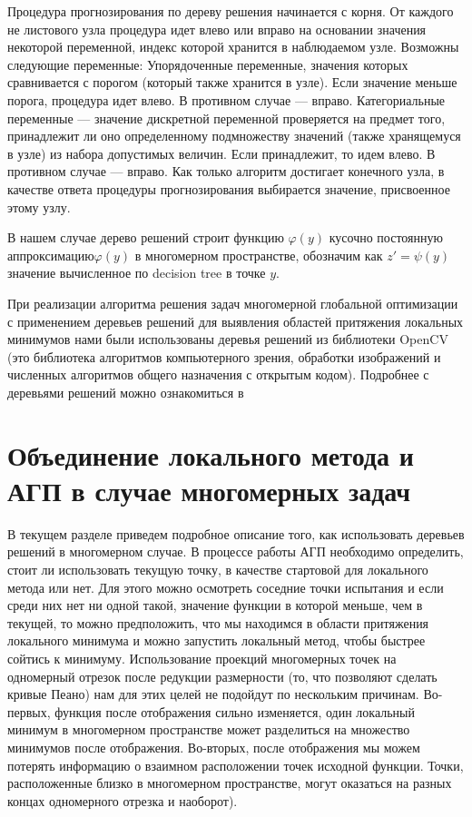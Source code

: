 \documentclass[12pt, a4paper, russian]{article}
\begin{document}
Процедура прогнозирования по дереву решения начинается с корня. От каждого не листового узла процедура идет влево или вправо на основании значения некоторой переменной, индекс которой хранится в наблюдаемом узле. Возможны следующие переменные:
Упорядоченные переменные, значения которых сравнивается с порогом (который также хранится в узле). Если значение меньше порога, процедура идет влево. В противном случае --- вправо.
Категориальные переменные --- значение дискретной переменной проверяется на предмет того, принадлежит ли оно определенному подмножеству значений (также хранящемуся в узле) из набора допустимых величин. Если принадлежит, то идем влево. В противном случае --- вправо. 
Как только алгоритм достигает конечного узла, в качестве ответа процедуры прогнозирования выбирается значение, присвоенное этому узлу. 

В нашем случае дерево решений строит функцию $\varphi(y)$ кусочно постоянную аппроксимацию$\varphi(y)$  в многомерном пространстве, обозначим как $z' = \psi(y)$ значение вычисленное по decision tree в точке $y$.

При реализации алгоритма  решения задач многомерной глобальной оптимизации с применением деревьев решений для выявления областей притяжения локальных минимумов нами были использованы  деревья решений из библиотеки OpenCV (это библиотека алгоритмов компьютерного зрения, обработки изображений и численных алгоритмов общего назначения с открытым кодом). Подробнее с  деревьями решений можно ознакомиться в \cite{fio_bib16}


\section{Объединение локального метода и АГП в случае многомерных задач}

В текущем разделе приведем подробное описание того, как использовать деревьев решений в многомерном случае. В процессе работы АГП необходимо определить, стоит ли использовать текущую точку, в качестве стартовой для локального метода или нет. Для этого можно осмотреть соседние точки испытания и если среди них нет ни одной такой, значение функции в которой меньше, чем в текущей, то можно предположить, что мы находимся в области притяжения локального минимума и можно запустить локальный метод, чтобы быстрее сойтись к минимуму. Использование проекций многомерных точек на одномерный отрезок после редукции размерности (то, что позволяют сделать кривые Пеано) нам для этих целей не подойдут по нескольким причинам. Во-первых, функция после отображения сильно изменяется, один локальный минимум в многомерном пространстве может разделиться на множество минимумов после отображения. Во-вторых, после отображения мы можем потерять информацию о взаимном расположении точек исходной функции. Точки, расположенные близко в многомерном пространстве, могут оказаться на разных концах одномерного отрезка и наоборот).
\end{document}
